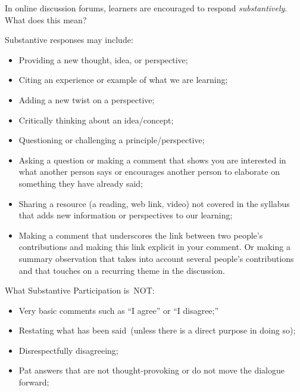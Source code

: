 \documentclass[
]{book}
\providecommand{\tightlist}{%
  \setlength{\itemsep}{0pt}\setlength{\parskip}{0pt}}
\theoremstyle{definition}
\theoremstyle{definition}
\theoremstyle{definition}
\theoremstyle{definition}
\theoremstyle{remark}
\begin{document}
In online discussion forums, learners are encouraged to respond \emph{substantively}. What does this mean?

Substantive responses may include:

\begin{itemize}
\tightlist
\item
  Providing a new thought, idea, or perspective;\\
\item
  Citing an experience or example of what we are learning;\\
\item
  Adding a new twist on a perspective;\\
\item
  Critically thinking about an idea/concept;\\
\item
  Questioning or challenging a principle/perspective;\\
\item
  Asking a question or making a comment that shows you are interested in what another person says or encourages another person to elaborate on something they have already said;\\
\item
  Sharing a resource (a reading, web link, video) not covered in the syllabus that adds new information or perspectives to our learning;\\
\item
  Making a comment that underscores the link between two people's contributions and making this link explicit in your comment. Or making a summary observation that takes into account several people's contributions and that touches on a recurring theme in the discussion.
\end{itemize}

What Substantive Participation is~NOT:

\begin{itemize}
\tightlist
\item
  Very basic comments such as ``I agree'' or ``I disagree;''\\
\item
  Restating what has been said~(unless there is a direct purpose in doing so);\\
\item
  Disrespectfully disagreeing;\\
\item
  Pat answers that are not thought-provoking or do not move the dialogue forward;
\end{itemize}
\end{document}
